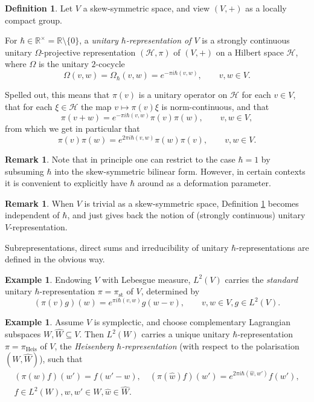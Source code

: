\documentclass[11pt, reqno]{amsart}
\theoremstyle{definition}
\newtheorem{defn}[theorem]{Definition}
\newtheorem{remark}[theorem]{Remark}
\newtheorem{example}[theorem]{Example}
\numberwithin{equation}{section}
\def\Heis{\mathrm{Heis}}
\def\R{\mathbb R}
\newcommand{\Hsp}{\mathcal{H}}
\newcommand{\standard}{\mathrm{st}}
\begin{document}
\begin{defn}\label{DefUniProjRep}
Let $V$ a skew-symmetric space, and view $(V,+)$ as a locally compact group.

For $\hbar\in \R^{\times} = \R \setminus \{0\} $, a \emph{unitary $\hbar$-representation of $V$} is a strongly continuous unitary $\Omega$-projective representation $(\Hsp,\pi)$ of $(V,+)$ on a Hilbert space $\Hsp$, where $\Omega$ is the unitary $2$-cocycle
\[
\Omega(v,w) = \Omega_{\hbar}(v,w) =  e^{-\pi i \hbar (v,w)},\qquad v,w\in V.
\] 
\end{defn}
Spelled out, this means that $\pi(v)$ is a unitary operator on $\Hsp$ for each $v\in V$, that for each $\xi\in \Hsp$ the map $v\mapsto \pi(v)\xi$ is norm-continuous, and that
\begin{equation}\label{EqProdProj}
\pi(v+w) = e^{-\pi i \hbar (v,w)}\pi(v)\pi(w),\qquad v,w\in V,
\end{equation}
from which we get in particular that 
\begin{equation}
\pi(v)\pi(w) = e^{2\pi i \hbar (v,w)}\pi(w)\pi(v),\qquad v,w\in V.
\end{equation}

\begin{remark}
Note that in principle one can restrict to the case $\hbar = 1$ by subsuming $\hbar$ into the skew-symmetric bilinear form. However, in certain contexts it is convenient to explicitly have $\hbar$ around as a deformation parameter.
\end{remark}
\begin{remark}
When $V$ is trivial as a skew-symmetric space, Definition \ref{DefUniProjRep} becomes independent of $\hbar$, and just gives back the notion of (strongly continuous) unitary $V$-representation.
\end{remark}

Subrepresentations, direct sums and irreducibility of unitary $\hbar$-representations are defined in the obvious way.


\begin{example}\label{ExaStandardRep}
Endowing $V$ with Lebesgue measure, 
$L^2(V)$ carries the \emph{standard} unitary $\hbar$-representation $\pi = \pi_{\standard}$ of $V$, determined by 
\begin{equation}\label{EqStandardDefDualRep}
(\pi(v)g)(w) = e^{\pi i\hbar (v,w)}g(w-v),\qquad v,w\in V,g\in L^2(V).
\end{equation}
\end{example}


\begin{example}\label{ExaHeisenberg}
Assume $V$ is symplectic, and choose complementary Lagrangian subspaces $W,\hat{W} \subseteq V$. Then $L^2(W)$ carries a unique unitary $\hbar$-representation $\pi= \pi_{\Heis}$ of $V$, the \emph{Heisenberg $\hbar$-representation} (with respect to the polarisation $(W,\hat{W})$), such that  \begin{multline*}
(\pi(w)f)(w') =  f(w'-w),\quad (\pi(\hat{w})f)(w') =  e^{2\pi i \hbar (\hat{w},w')}f(w'),\\ f\in L^2(W), w,w'\in W,\hat{w}\in \hat{W}.
\end{multline*}
\end{example}
\end{document}
